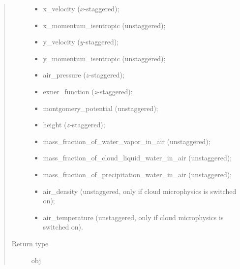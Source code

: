 \documentclass[letterpaper,10pt,english]{sphinxmanual}
\begin{document}
\begin{fulllineitems}
\begin{fulllineitems}
\begin{quote}
\begin{description}
\begin{itemize}
\item {} 
x\_velocity (\(x\)-staggered);

\item {} 
x\_momentum\_isentropic (unstaggered);

\item {} 
y\_velocity (\(y\)-staggered);

\item {} 
y\_momentum\_isentropic (unstaggered);

\item {} 
air\_pressure (\(z\)-staggered);

\item {} 
exner\_function (\(z\)-staggered);

\item {} 
montgomery\_potential (unstaggered);

\item {} 
height (\(z\)-staggered);

\item {} 
mass\_fraction\_of\_water\_vapor\_in\_air (unstaggered);

\item {} 
mass\_fraction\_of\_cloud\_liquid\_water\_in\_air (unstaggered);

\item {} 
mass\_fraction\_of\_precipitation\_water\_in\_air (unstaggered);

\item {} 
air\_density (unstaggered, only if cloud microphysics is switched on);

\item {} 
air\_temperature (unstaggered, only if cloud microphysics is switched on).

\end{itemize}


\item[{Return type}] \leavevmode
obj

\end{description}\end{quote}

\end{fulllineitems}



\end{fulllineitems}
\end{document}
